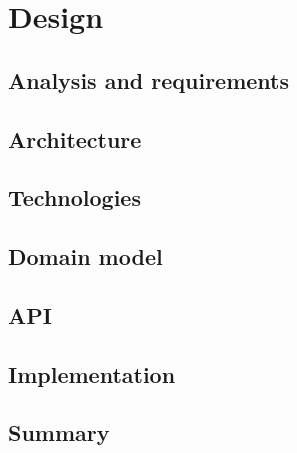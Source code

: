 \section{Design}
\label{sec:design}


\subsection{Analysis and requirements}

\subsection{Architecture}

\subsection{Technologies}

\subsection{Domain model}

\subsection{API}

\subsection{Implementation}

\subsection{Summary}
